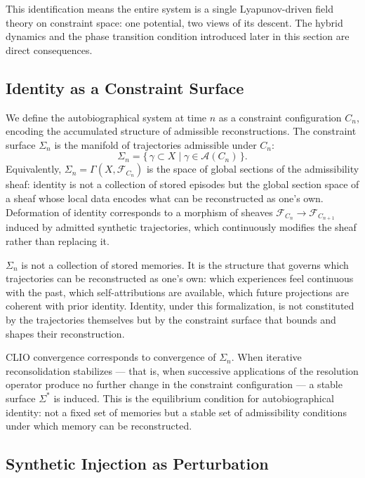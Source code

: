 \documentclass[12pt, a4paper]{article}
\begin{document}
This identification means the entire system is a single Lyapunov-driven field theory on constraint space: one potential, two views of its descent. The hybrid dynamics and the phase transition condition introduced later in this section are direct consequences.

\subsection{Identity as a Constraint Surface}

We define the autobiographical system at time $n$ as a constraint configuration $C_n$, encoding the accumulated structure of admissible reconstructions. The constraint surface $\Sigma_n$ is the manifold of trajectories admissible under $C_n$:
\[
\Sigma_n = \bigl\{\, \gamma \subset X \mid \gamma \in \mathcal{A}(C_n) \,\bigr\}.
\]
Equivalently, $\Sigma_n = \Gamma(X, \mathcal{F}_{C_n})$ is the space of global sections of the admissibility sheaf: identity is not a collection of stored episodes but the global section space of a sheaf whose local data encodes what can be reconstructed as one's own. Deformation of identity corresponds to a morphism of sheaves $\mathcal{F}_{C_n} \to \mathcal{F}_{C_{n+1}}$ induced by admitted synthetic trajectories, which continuously modifies the sheaf rather than replacing it.

$\Sigma_n$ is not a collection of stored memories. It is the structure that governs which trajectories can be reconstructed as one's own: which experiences feel continuous with the past, which self-attributions are available, which future projections are coherent with prior identity. Identity, under this formalization, is not constituted by the trajectories themselves but by the constraint surface that bounds and shapes their reconstruction.

CLIO convergence corresponds to convergence of $\Sigma_n$. When iterative reconsolidation stabilizes --- that is, when successive applications of the resolution operator produce no further change in the constraint configuration --- a stable surface $\Sigma^*$ is induced. This is the equilibrium condition for autobiographical identity: not a fixed set of memories but a stable set of admissibility conditions under which memory can be reconstructed.

\subsection{Synthetic Injection as Perturbation}
\end{document}
